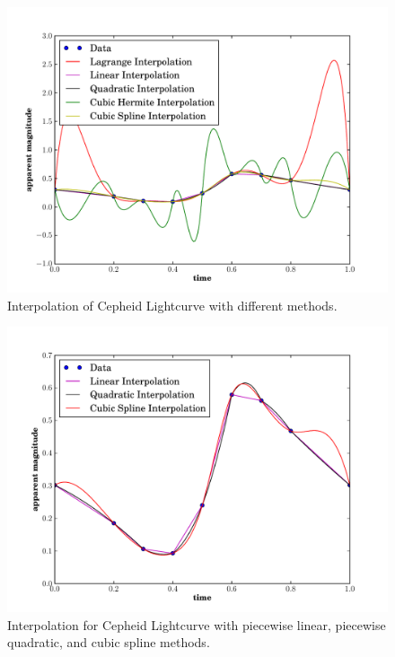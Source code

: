 \documentclass[10pt]{article}
\begin{document}
\begin{figure}[hbt]
  \begin{center}
    \includegraphics[scale = 0.5]{Plots/plot5.pdf}
    \caption{\label{fig:Interpol} Interpolation of Cepheid Lightcurve with different methods.}
  \end{center}
\end{figure}
  

\begin{figure}[hbt]
  \begin{center}
    \includegraphics[scale = 0.5]{Plots/plot6.pdf}
    \caption{\label{fig:Interpol2} Interpolation for Cepheid Lightcurve with piecewise linear, piecewise quadratic, and cubic spline methods.}
  \end{center}
\end{figure}
\end{document}
